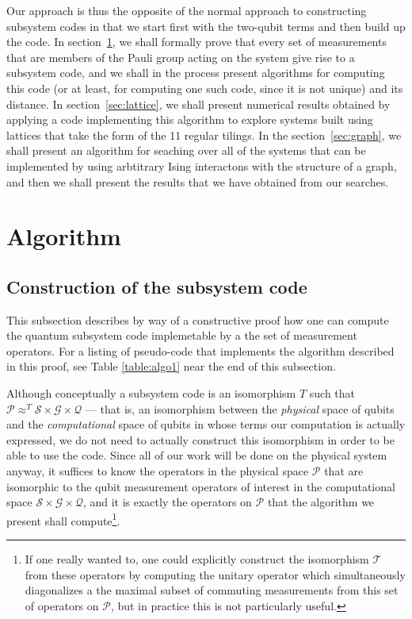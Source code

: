 \documentclass[twocolumn,showpacs,preprintnumbers,amsmath,amssymb,nofootinbib,pra,floatfix]{revtex4-1}
\newenvironment{remark}[1][Remark]{\begin{trivlist}
\item[\hskip \labelsep {\bfseries #1}]}{\end{trivlist}}
\begin{document}
Our approach is thus the opposite of the normal approach to constructing subsystem codes in that we start first with the two-qubit terms and then build up the code.  In section~\ref{sec:algorithm}, we shall formally prove that every set of measurements that are members of the Pauli group acting on the system give rise to a subsystem code, and we shall in the process present algorithms for computing this code (or at least, for computing one such code, since it is not unique) and its distance.  In section~\ref{sec:lattice}, we shall present numerical results obtained by applying a code implementing this algorithm to explore systems built using lattices that take the form of the 11 regular tilings.  In the section~\ref{sec:graph}, we shall present an algorithm for seaching over all of the systems that can be implemented by using arbtitrary Ising interactons
with the structure of a graph, and then we shall present the results that we have obtained from our searches.

\section{Algorithm} \label{sec:algorithm}

\subsection{Construction of the subsystem code}

\begin{remark}
This subsection describes by way of a constructive proof how one can compute the quantum subsystem code implemetable by a the set of measurement operators.  For a listing of pseudo-code that implements the algorithm described in this proof, see Table \ref{table:algo1} near the end of this subsection.
\end{remark}
Although conceptually a subsystem code is an isomorphism $T$ such that  $\mathscr{P}\approx^T \mathscr{S}\times\mathscr{G}\times\mathscr{Q}$ --- that is, an isomorphism between the \emph{physical} space of qubits and the \emph{computational} space of qubits in whose terms our computation is actually expressed, we do not need to actually construct this isomorphism in order to be able to use the code.  Since all of our work will be done on the physical system anyway, it suffices to know the operators in the physical space $\mathscr{P}$ that are isomorphic to the qubit measurement operators of interest in the computational space $\mathscr{S}\times\mathscr{G}\times\mathscr{Q}$, and it is exactly the operators on $\mathscr{P}$ that the algorithm we present shall compute\footnote{If one really wanted to, one could explicitly construct the isomorphism $\mathscr{T}$ from these operators by computing the unitary operator which simultaneously diagonalizes a the maximal subset of commuting measurements from this set of operators on $\mathscr{P}$, but in practice this is not particularly useful.}.
\end{document}
